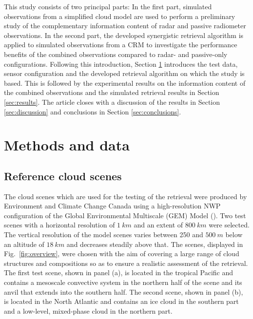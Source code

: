 \documentclass[journal abbreviation, manuscript]{copernicus}
\begin{document}
This study consists of two principal parts: In the first part, simulated
observations from a simplified cloud model are used to perform a preliminary
study of the complementary information content of radar and passive radiometer
observations. In the second part, the developed synergistic retrieval algorithm
is applied to simulated observations from a CRM to investigate the performance
benefits of the combined observations compared to radar- and passive-only
configurations. Following this introduction, Section \ref{sec:methods_and_data}
introduces the test data, sensor configuration and the developed retrieval
algorithm on which the study is based. This is followed by the experimental
results on the information content of the combined observations and the
simulated retrieval results in Section \ref{sec:results}. The article closes
with a discussion of the results in Section \ref{sec:discussion} and conclusions
in Section \ref{sec:conclusions}.


\section{Methods and data}
\label{sec:methods_and_data}

\subsection{Reference cloud scenes}

The cloud scenes which are used for the testing of the retrieval were produced
by Environment and Climate Change Canada using a high-resolution NWP
configuration of the Global Environmental Multiscale (GEM) Model
(\cite{cote98}). Two test scenes with a horizontal resolution of $1\ \unit{km}$
and an extent of $800\ \unit{km}$ were selected. The vertical resolution of the
model scenes varies between 250 and $500\ \unit{m}$ below an altitude of
$18\ \unit{km}$ and decreases steadily above that. The scenes, displayed in
Fig.~\ref{fig:overview}, were chosen with the aim of covering a large range of
cloud structures and compositions so as to ensure a realistic assessment of the
retrieval. The first test scene, shown in panel (a), is located in the tropical
Pacific and contains a mesoscale convective system in the northern half of the scene
and its anvil that extends into the southern half. The second scene, shown in
panel (b), is located in the North Atlantic and contains an ice cloud in the
southern part and a low-level, mixed-phase cloud in the northern part.
\end{document}
